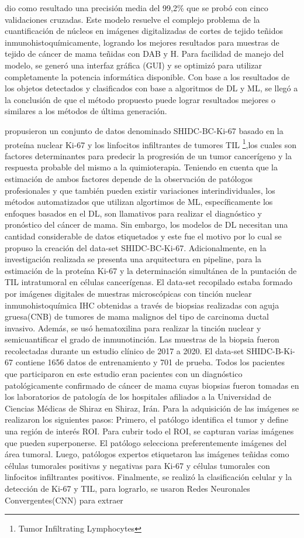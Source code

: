 dio como resultado una precisión media del 99,2\% que se probó con cinco validaciones cruzadas. Este modelo resuelve el complejo problema de la cuantificación de núcleos en imágenes digitalizadas de cortes de tejido teñidos inmunohistoquímicamente, logrando los mejores resultados para muestras de tejido de cáncer de mama teñidas con DAB y H. Para facilidad de manejo del modelo, se generó una interfaz gráfica (GUI) y se optimizó para utilizar completamente la potencia informática disponible. Con base a los resultados de los objetos detectados y clasificados con base a algoritmos de DL y ML, se llegó a la conclusión de que el método propuesto puede lograr resultados mejores o similares a los métodos de última generación. 

\cite{Negahbani2021} propusieron un conjunto de datos denominado SHIDC-BC-Ki-67 basado en la proteína nuclear Ki-67 y los linfocitos infiltrantes de tumores TIL \footnote{Tumor Infiltrating Lymphocytes},los cuales son factores determinantes para predecir la progresión de un tumor cancerígeno y  la respuesta probable del mismo a la quimioterapia. Teniendo en cuenta que la estimación de ambos factores depende de la observación de patólogos profesionales y que también pueden existir variaciones interindividuales, los métodos automatizados que utilizan algortimos de ML, específicamente los enfoques basados en el DL, son llamativos para realizar el diagnóstico y pronóstico del cáncer de mama. Sin embargo, los modelos de DL necesitan una cantidad considerable de datos etiquetados y este fue el motivo por lo cual se propuso la creación del data-set SHIDC-BC-Ki-67. Adicionalmente, en la investigación realizada se presenta una arquitectura en pipeline, para la estimación de la proteína Ki-67 y la determinación simultánea de la puntación de TIL intratumoral en células cancerígenas. El data-set recopilado estaba formado por imágenes digitales de muestras microscópicas con tinción nuclear inmunohistoquímica IHC obtenidas a través de biopsias realizadas con aguja gruesa(CNB) de tumores de mama malignos del tipo de carcinoma ductal invasivo. Además, se usó hematoxilina para realizar la tinción nuclear y semicuantificar el grado de inmunotinción. Las muestras de la biopsia fueron recolectadas durante un estudio clínico de 2017 a 2020. El data-set SHIDC-B-Ki-67 contiene 1656 datos de entrenamiento y 701 de prueba. Todos los pacientes que participaron en este estudio eran pacientes con un diagnóstico patológicamente confirmado de cáncer de mama cuyas biopsias fueron tomadas en los laboratorios de patología de los hospitales afiliados a la Universidad de Ciencias Médicas de Shiraz en Shiraz, Irán. Para la adquisición de las imágenes se realizaron los siguientes pasos: Primero, el patólogo identifica el tumor y define una región de interés ROI. Para cubrir todo el ROI, se capturan varias imágenes que pueden superponerse. El patólogo selecciona preferentemente imágenes del área tumoral. Luego, patólogos expertos etiquetaron las imágenes teñidas como células tumorales positivas y negativas para Ki-67 y células tumorales con linfocitos infiltrantes positivos. Finalmente, se realizó la clasificación celular y la detección de Ki-67 y TIL, para lograrlo, se usaron Redes Neuronales Convergentes(CNN) para extraer 